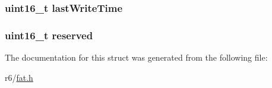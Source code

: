 \subsubsection[{\texorpdfstring{last\+Write\+Time}{lastWriteTime}}]{\setlength{\rightskip}{0pt plus 5cm}uint16\+\_\+t last\+Write\+Time}\hypertarget{structdir__entry_ab140bb773b2ff0ddf7199efc083ce037}{}\label{structdir__entry_ab140bb773b2ff0ddf7199efc083ce037}
\subsubsection[{\texorpdfstring{reserved}{reserved}}]{\setlength{\rightskip}{0pt plus 5cm}uint16\+\_\+t reserved}\hypertarget{structdir__entry_a5a6ed8c04a3db86066924b1a1bf4dad3}{}\label{structdir__entry_a5a6ed8c04a3db86066924b1a1bf4dad3}


The documentation for this struct was generated from the following file\+:\begin{DoxyCompactItemize}
\item 
r6/\hyperlink{fat_8h}{fat.\+h}\end{DoxyCompactItemize}
